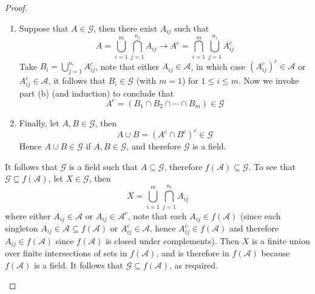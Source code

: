 \documentclass[11pt]{article}
\newcommand{\A}{\mathcal{A}}
\newcommand{\G}{\mathcal{G}}
\newcommand{\seq}{\subseteq}
\newcommand{\un}{\cup}
\newcommand{\ic}{\cap}
\begin{document}
\begin{proof}
\begin{enumerate}
\begin{enumerate}
            \item Suppose that $A \in \G$, then there exist $A_{ij}$ such that
            \[ A = \bigcup_{i=1}^{m} \bigcap_{j=1}^{n_i} A_{ij}  \longrightarrow A^{c} = \bigcap_{i=1}^{m} \bigcup_{j=1}^{n_i} A_{ij}^{c} \]
            Take $B_{i} = \bigcup_{j=1}^{n_i} A_{ij}^{c}$, note that either $A_{ij} \in \A$, in which case $(A_{ij}^{c})^c \in \A$ or $A_{ij}^{c} \in \A$, it follows that $B_i \in \G$ (with $m = 1$) for $1 \leq i \leq m$. Now we invoke part (b) (and induction) to conclude that
            \[ A^{c} = \left (B_1 \ic B_2 \ic \cdots \ic B_m \right) \in \G \] 
            \item Finally, let $A, B \in \G$, then
            \[ A \un B = (A^{c} \ic B^{c})^{c} \in \G \]
            Hence $A \un B \in \G$ if $A, B \in \G$, and therefore $\G$ is a field.
        \end{enumerate}
        It follows that $\G$ is a field such that $A \seq \G$, therefore $f(\A) \seq \G$. To see that $\G \seq f(\A)$, let $X \in \G$, then
        \[ X = \bigcup_{i=1}^{m} \bigcap_{j=1}^{n_i} A_{ij} \]
        where either $A_{ij} \in \A$ or $A_{ij} \in \A^{c}$, note that each $A_{ij} \in f(\A)$ (since each singleton $A_{ij} \in \A \seq f(\A)$ or $A_{ij}^{c} \in \A$, hence $A_{ij}^{c} \in f(\A)$ and therefore $A_{ij} \in f(\A)$ since $f(\A)$ is closed under complements). Then $X$ is a finite union over finite intersections of sets in $f(\A)$, and is therefore in $f(\A)$ because $f(\A)$ is a field. It follows that $\G \seq f(\A)$, as required. 
    \end{enumerate}
\end{proof}
\end{document}
